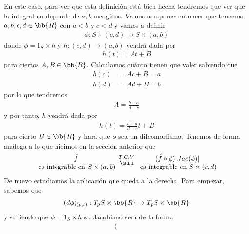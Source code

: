 \begin{observacion}
    En este caso, para ver que esta definición está bien hecha tendremos que ver que la integral no depende de $a,b$ escogidos. Vamos a suponer entonces que tenemos $a,b,c,d\in \bb{R}$ con $a<b$ y $c<d$ y vamos a definir
    \begin{gather*}
        \phi: S \times (c,d) \to S\times(a,b)
    \end{gather*}
    donde $\phi=1_S\times h$ y $h:(c,d) \to (a,b)$ vendrá dada por 
    \begin{gather*}
        h(t) = At + B
    \end{gather*}
    para ciertos $A,B\in \bb{R}$. Calculamos cuánto tienen que valer sabiendo que 
    \begin{align*}
        h(c) &= Ac + B = a\\
        h(d) &= Ad + B = b
    \end{align*}
    por lo que tendremos 
    \begin{gather*}
        A = \frac{b-a}{d-c}
    \end{gather*}
    y por tanto, $h$ vendrá dada por 
    \begin{gather*}
        h(t) = \frac{b-a}{d-c}t + B
    \end{gather*}
    para cierto $B\in \bb{R}$ y hará que $\phi$ sea un difeomorfismo. Tenemos de forma análoga a lo que hicimos en la sección anterior que 
    \begin{gather*}
        \begin{array}{c}
            \tilde{f}\\
            \text{ es integrable en $S\times(a,b)$}
        \end{array}
        \overset{T.C.V.}{\sii}
        \begin{array}{c}
            (\tilde{f} \circ \phi) |Jac(\phi)|\\
            \text{ es integrable en $S\times(c,d)$}
        \end{array}
    \end{gather*}
    De nuevo estudiamos la aplicación que queda a la derecha. Para empezar, sabemos que
    \begin{gather*}
        (d\phi)_{(p,t)} : T_pS\times \bb{R} \to T_pS\times \bb{R}
    \end{gather*}
    y sabiendo que $\phi=1_S \times h$ su Jacobiano será de la forma
    \begin{gather*}
        \left(
        \begin{array}{ccc|c}
            &&&\\

\end{array}
\end{gather*}
\end{observacion}
